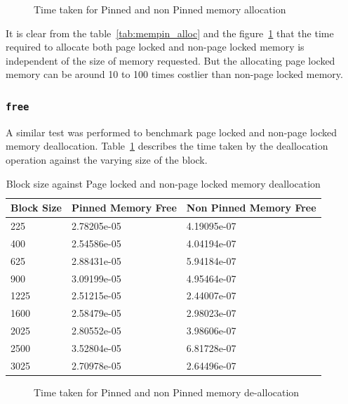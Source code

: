 \begin{figure}[h]
  
  \caption{Time taken for Pinned and non Pinned memory allocation}
  \label{fig:mempin_alloc}
\end{figure}

It is clear from the table~\ref{tab:mempin_alloc} and the figure~\ref{fig:mempin_alloc}
that the time required to allocate both page locked and non-page locked memory
is independent of the size of memory requested. But the allocating page locked
memory can be around 10 to 100 times costlier than non-page locked memory.

\subsubsection{\texttt{free}}
A similar test was performed to benchmark page locked and non-page locked memory
deallocation. Table~\ref{tab:mempin_free} describes the time taken by the deallocation
operation against the varying size of the block.

\begin{table}[h]
  \centering
  \caption{Block size against Page locked and non-page locked memory deallocation}
  \begin{tabular}{l l l}
    \hline
    Block Size & Pinned Memory Free & Non Pinned Memory Free \\
    \hline
    225        & 2.78205e-05        & 4.19095e-07            \\
    400        & 2.54586e-05        & 4.04194e-07            \\
    625        & 2.88431e-05        & 5.94184e-07            \\
    900        & 3.09199e-05        & 4.95464e-07            \\
    1225       & 2.51215e-05        & 2.44007e-07            \\
    1600       & 2.58479e-05        & 2.98023e-07            \\
    2025       & 2.80552e-05        & 3.98606e-07            \\
    2500       & 3.52804e-05        & 6.81728e-07            \\
    3025       & 2.70978e-05        & 2.64496e-07            \\
    \hline
  \end{tabular}
  \label{tab:mempin_free}
\end{table}

\begin{figure}[h]
  
  \caption{Time taken for Pinned and non Pinned memory de-allocation}
  \label{fig:mempin_free}
\end{figure}

